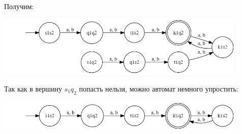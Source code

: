 \documentclass{article}
\begin{document}
    Получим:
    \begin{center}
        \includegraphics[width=0.9\textwidth]{task2/pic2.2res}\\
    \end{center}
    Так как в вершину $s_1q_2$ попасть нельзя, можно автомат немного упростить:
    \begin{center}
        \includegraphics[width=0.9\textwidth]{task2/pic2.2res(simplier)}\\
    \end{center}
    
\end{document}
